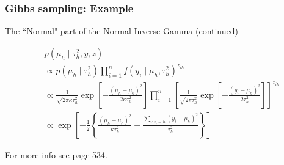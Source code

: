 \documentclass{beamer}
\begin{document}
\begin{frame}[fragile]
\frametitle{Gibbs sampling: Example}

The ``Normal" part of the Normal-Inverse-Gamma (continued)

\begin{align*}
&p(\mu_h \mid \tau^2_h, y, z) \\
&\propto p(\mu_h \mid \tau^2_{h})  \prod_{i=1}^n   f(y_i \mid \mu_h, \tau^2_h)^{z_{ih}}\\
&\propto \frac{1}{\sqrt{2\pi \kappa \tau_h^2  }}\exp\left[-\frac{(\mu_{h} -  \mu_0)^2 }{ 2\kappa \tau_h^2 } \right] \prod_{i=1}^n \left[ \frac{1}{\sqrt{2\pi \tau^2_{h} }}\exp\left[-\frac{(y_i - \mu_{h} )^2 }{ 2\tau^2_{h} } \right] \right]^{z_{ih}} \\
&\propto \exp\left[-\frac{1}{2}\left\{  \frac{(\mu_{h} -  \mu_0)^2 }{ \kappa \tau_h^2 }  + \frac{\sum_{i : z_i = h}(y_i - \mu_{h} )^2 }{ \tau^2_{h} } \right\}\right]
\end{align*}

For more info see page 534.


\end{frame}
\end{document}
